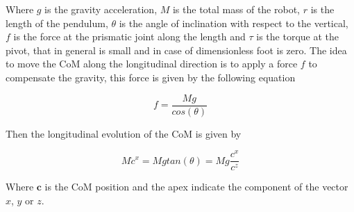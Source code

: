 \documentclass[a4paper]{article}
\begin{document}
Where $g$ is the gravity acceleration, $M$ is the total mass of the robot, $r$ is the length of the pendulum, $\theta$ is the angle of inclination with respect to the vertical, $f$ is the force at the prismatic joint along the length and $\tau$ is the torque at the pivot, that in general is small and in case of dimensionless foot is zero. The idea to move the CoM along the longitudinal direction is to apply a force $f$ to compensate the gravity, this force is given by the following equation

\begin{equation}
    f = \frac{Mg}{cos(\theta)}
\end{equation}

Then the longitudinal evolution of the CoM is given by

\begin{equation}
    M\ddot{c}^x=Mgtan(\theta)=Mg\frac{c^x}{c^z}
    \label{eq:long_ev_x}
\end{equation}

Where $\pmb{c}$ is the CoM position and the apex indicate the component of the vector $x$, $y$ or $z$. 

\end{document}
